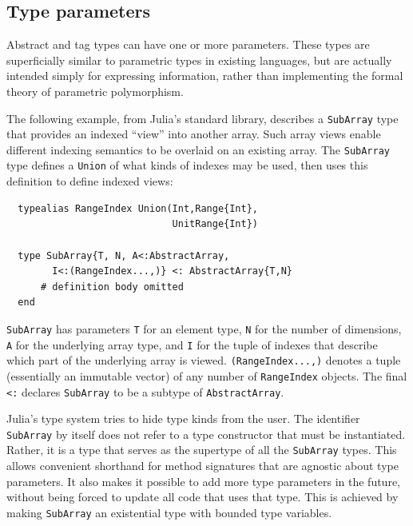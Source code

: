 \documentclass[10pt, preprint]{sigplanconf}
\begin{document}



\subsection{Type parameters}
\label{sec:typeparameters}

Abstract and tag types can have one or more parameters. These
types are superficially similar to parametric types in existing
languages, but are actually intended simply for expressing information, rather
than implementing the formal theory of parametric polymorphism.

The following example, from Julia's standard library, describes a \verb|SubArray|
type that provides an indexed ``view'' into another array. Such array views
enable different indexing semantics to be overlaid on an existing array.
The \verb|SubArray| type
defines a \verb|Union| of what kinds of indexes may be used, then uses this
definition to define indexed views:

\begin{lstlisting}
  typealias RangeIndex Union(Int,Range{Int},
                             UnitRange{Int})

  type SubArray{T, N, A<:AbstractArray,
		I<:(RangeIndex...,)} <: AbstractArray{T,N}
      # definition body omitted
  end
\end{lstlisting}
%
\verb|SubArray| has parameters \verb|T| for an element type, \verb|N| for the
number of dimensions, \verb|A| for the underlying array type, and \verb|I|
for the tuple of indexes that describe which part of the underlying array
is viewed.
\verb|(RangeIndex...,)| denotes a tuple (essentially an immutable vector) of
any number of \verb|RangeIndex| objects.
The final \verb|<:| declares \verb|SubArray| to be a subtype of
\verb|AbstractArray|.

Julia's type system tries to hide type kinds from
the user. The identifier \verb|SubArray| by itself does not refer to a
type constructor that must be instantiated. Rather, it is a type
that serves as the supertype of all the \verb|SubArray| types. This allows
convenient shorthand for method signatures that are agnostic about type parameters.
It also makes it possible to add more type parameters in the future, without
being forced to update all code that uses that type.
This is achieved by making \verb|SubArray| an existential type with bounded
type variables.
\end{document}
